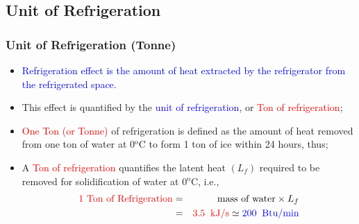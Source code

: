 \documentclass[10pt,compress,handout,ignorenonframetext]{beamer}
\begin{document}
\subsection{Unit of Refrigeration}
\begin{frame}
 \frametitle{Unit of Refrigeration (Tonne)}
 \begin{itemize}
  \item <1-> \textcolor{blue}{Refrigeration effect is the amount of heat extracted by the refrigerator from the refrigerated space.}
  \item <2-> This effect is quantified by the \textcolor{blue}{unit of refrigeration}, or \textcolor{red}{Ton of refrigeration};
  \item <3-> \textcolor{red}{One Ton (or Tonne)} of refrigeration is defined as the amount of heat removed from one ton of water at 0$^{\text{o}}$C to form 1 ton of ice within 24 hours, thus;
  \item <4-> A \textcolor{red}{Ton of refrigeration} quantifies the latent heat $\left(L_{f}\right)$ required to be removed for solidification of water at 0$^{\text{o}}$C, i.e.,
   \begin{eqnarray}
    \textcolor{red}{\text{1 Ton of Refrigeration}} &=& \text{mass of water} \times L_{f} \nonumber \\
                                                   &=& \textcolor{red}{3.5\;\;\text{kJ/s}} \simeq \textcolor{blue}{200\;\; \text{Btu/min}}\nonumber 
   \end{eqnarray}
 \end{itemize}
\end{frame}
\end{document}
